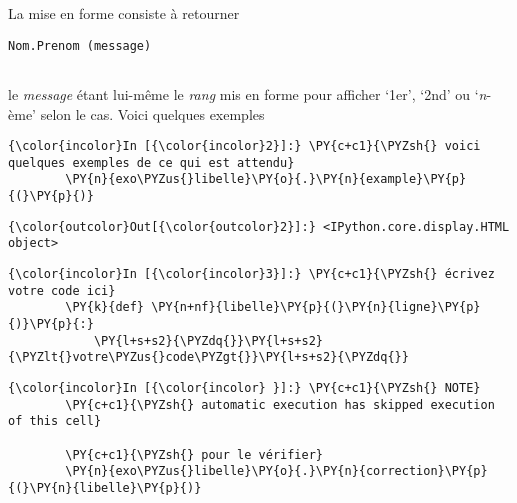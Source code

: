     La mise en forme consiste à retourner

\begin{verbatim}
Nom.Prenom (message)
 
\end{verbatim}

le \emph{message} étant lui-même le \emph{rang} mis en forme pour
afficher `1er', `2nd' ou `\emph{n}-ème' selon le cas. Voici quelques
exemples

    \begin{Verbatim}[commandchars=\\\{\}]
{\color{incolor}In [{\color{incolor}2}]:} \PY{c+c1}{\PYZsh{} voici quelques exemples de ce qui est attendu}
        \PY{n}{exo\PYZus{}libelle}\PY{o}{.}\PY{n}{example}\PY{p}{(}\PY{p}{)}
\end{Verbatim}


\begin{Verbatim}[commandchars=\\\{\}]
{\color{outcolor}Out[{\color{outcolor}2}]:} <IPython.core.display.HTML object>
\end{Verbatim}
            
    \begin{Verbatim}[commandchars=\\\{\}]
{\color{incolor}In [{\color{incolor}3}]:} \PY{c+c1}{\PYZsh{} écrivez votre code ici}
        \PY{k}{def} \PY{n+nf}{libelle}\PY{p}{(}\PY{n}{ligne}\PY{p}{)}\PY{p}{:}
            \PY{l+s+s2}{\PYZdq{}}\PY{l+s+s2}{\PYZlt{}votre\PYZus{}code\PYZgt{}}\PY{l+s+s2}{\PYZdq{}}
\end{Verbatim}


    \begin{Verbatim}[commandchars=\\\{\}]
{\color{incolor}In [{\color{incolor} }]:} \PY{c+c1}{\PYZsh{} NOTE}
        \PY{c+c1}{\PYZsh{} automatic execution has skipped execution of this cell}
        
        \PY{c+c1}{\PYZsh{} pour le vérifier}
        \PY{n}{exo\PYZus{}libelle}\PY{o}{.}\PY{n}{correction}\PY{p}{(}\PY{n}{libelle}\PY{p}{)}
\end{Verbatim}



    
    
    
